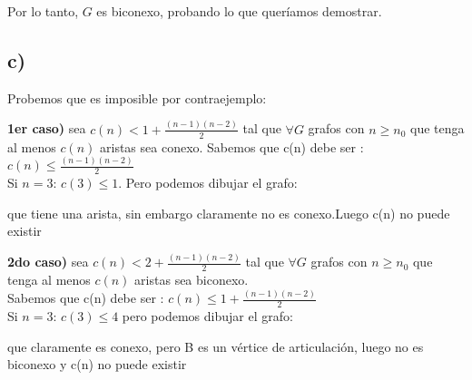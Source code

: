 \documentclass{article}
\begin{document}
Por lo tanto, $G$ es biconexo, probando lo que queríamos demostrar.

\newpage
\subsection{c)}





Probemos que es imposible por contraejemplo:

\textbf{1er caso)} sea $c(n) < 1 + \frac{(n-1)(n-2)}{2}$ tal que $\forall G$ grafos con $n \geq n_0$ que tenga al menos $c(n)$ aristas sea conexo.
Sabemos que c(n) debe ser : $c(n) \leq \frac{(n-1)(n-2)}{2}$ \\

Si $n = 3$: $c(3) \leq 1$. Pero podemos dibujar el grafo:
\begin{center}
\end{center}
que tiene una arista, sin embargo claramente no es conexo.Luego c(n) no puede existir

\textbf{2do caso)} sea $c(n) < 2 + \frac{(n-1)(n-2)}{2}$ tal que $\forall G$ grafos con $n \geq n_0$ que tenga al menos $c(n)$ aristas sea biconexo.\\
Sabemos que c(n) debe ser : $c(n) \leq 1 + \frac{(n-1)(n-2)}{2}$ \\

Si $n = 3$: $c(3) \leq 4$ pero podemos dibujar el grafo:
\begin{center}
\end{center}
que claramente es conexo, pero B es un vértice de articulación, luego no es biconexo y c(n) no puede existir
\end{document}
